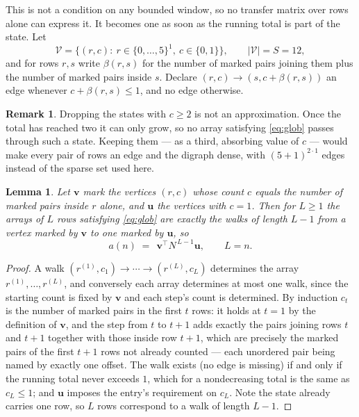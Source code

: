 \documentclass[11pt,a4paper]{article}
\theoremstyle{plain}
\newtheorem{lemma}[theorem]{Lemma}
\theoremstyle{definition}
\newtheorem{remark}[theorem]{Remark}
\begin{document}
This is not a condition on any bounded window, so no transfer matrix over rows alone can
express it. It becomes one as soon as the running total is part of the state. Let
\[
\mathcal V=\bigl\{(r,c):\ r\in\{0,\dots,5\}^{1},\ c\in\{0,1\}\bigr\},
\qquad |\mathcal V|=S=12,
\]
and for rows $r,s$ write $\beta(r,s)$ for the number of marked pairs joining them plus the
number of marked pairs inside $s$. Declare $(r,c)\to(s,c+\beta(r,s))$ an edge whenever
$c+\beta(r,s)\le1$, and no edge otherwise.

\begin{remark}
Dropping the states with $c\ge2$ is not an approximation. Once the total has reached two it
can only grow, so no array satisfying \eqref{eq:glob} passes through such a state. Keeping
them --- as a third, absorbing value of $c$ --- would make every pair of rows an edge and
the digraph dense, with $(5+1)^{2\cdot1}$ edges instead of the sparse set used here.
\end{remark}

\begin{lemma}\label{lem:walk}
Let $\mathbf{v}$ mark the vertices $(r,c)$ whose count $c$ equals the number of marked pairs
inside $r$ alone, and $\mathbf{u}$ the vertices with $c=1$. Then for $L\ge1$ the arrays
of $L$ rows satisfying \eqref{eq:glob} are exactly the walks of length $L-1$ from a
vertex marked by $\mathbf{v}$ to one marked by $\mathbf{u}$, so
\[
a(n)\;=\;\,\mathbf{v}^{\!\top}N^{\,L-1}\mathbf{u},\qquad L=n .
\]
\end{lemma}

\begin{proof}
A walk $(r^{(1)},c_1)\to\cdots\to(r^{(L)},c_L)$ determines the array
$r^{(1)},\dots,r^{(L)}$, and conversely each array determines at most one walk, since the
starting count is fixed by $\mathbf{v}$ and each step's count is determined. By induction
$c_t$ is the number of marked pairs in the first $t$ rows: it holds at $t=1$ by the
definition of $\mathbf{v}$, and the step from $t$ to $t+1$ adds exactly the pairs joining
rows $t$ and $t+1$ together with those inside row $t+1$, which are precisely the marked
pairs of the first $t+1$ rows not already counted --- each unordered pair being named by
exactly one offset. The walk exists (no edge is missing) if and only if the running total
never exceeds $1$, which for a nondecreasing total is the same as $c_L\le1$; and
$\mathbf{u}$ imposes the entry's requirement on $c_L$. Note the state already carries one
row, so $L$ rows correspond to a walk of length $L-1$.
\end{proof}
\end{document}
